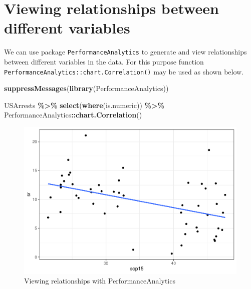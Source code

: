 \documentclass[
]{book}
\newenvironment{Shaded}{\begin{snugshade}}{\end{snugshade}}
\newcommand{\FunctionTok}[1]{\textcolor[rgb]{0.13,0.29,0.53}{\textbf{#1}}}
\newcommand{\NormalTok}[1]{#1}
\newcommand{\SpecialCharTok}[1]{\textcolor[rgb]{0.81,0.36,0.00}{\textbf{#1}}}
\begin{document}
\hypertarget{viewing-relationships-between-different-variables}{%
\section{Viewing relationships between different variables}\label{viewing-relationships-between-different-variables}}

We can use package \texttt{PerformanceAnalytics} to generate and view relationships between different variables in the data. For this purpose function \texttt{PerformanceAnalytics::chart.Correlation()} may be used as shown below.

\begin{Shaded}
\begin{Highlighting}[]
\FunctionTok{suppressMessages}\NormalTok{(}\FunctionTok{library}\NormalTok{(PerformanceAnalytics))}

\NormalTok{USArrests }\SpecialCharTok{\%\textgreater{}\%} 
  \FunctionTok{select}\NormalTok{(}\FunctionTok{where}\NormalTok{(is.numeric)) }\SpecialCharTok{\%\textgreater{}\%} 
\NormalTok{  PerformanceAnalytics}\SpecialCharTok{::}\FunctionTok{chart.Correlation}\NormalTok{()}
\end{Highlighting}
\end{Shaded}

\begin{figure}

{\centering \includegraphics{DauR_files/figure-latex/unnamed-chunk-345-1} 

}

\caption{Viewing relationships with PerformanceAnalytics}\label{fig:unnamed-chunk-345}
\end{figure}
\end{document}
